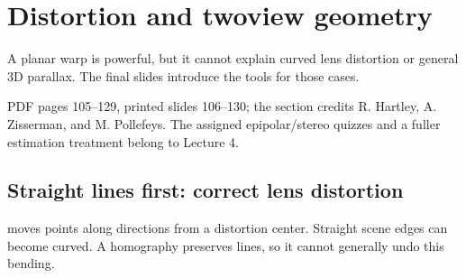 \documentclass[letterpaper,11pt,english,openany,oneside]{jupyterBook}
\begin{document}
\section{Distortion and two\sphinxhyphen{}view geometry}
\label{\detokenize{lectures/lecture02/two-view:distortion-and-two-view-geometry}}\label{\detokenize{lectures/lecture02/two-view:lec02-two-view}}\label{\detokenize{lectures/lecture02/two-view::doc}}
\sphinxAtStartPar
A planar warp is powerful, but it cannot explain curved lens distortion or general 3D parallax. The final slides introduce the tools for those cases.

\sphinxAtStartPar
{} PDF pages 105–129, printed slides 106–130; the section credits R. Hartley, A. Zisserman, and M. Pollefeys. The assigned epipolar/stereo quizzes and a fuller estimation treatment belong to Lecture 4.


\subsection{Straight lines first: correct lens distortion}
\label{\detokenize{lectures/lecture02/two-view:straight-lines-first-correct-lens-distortion}}
\sphinxAtStartPar
{} moves points along directions from a distortion center. Straight scene edges can become curved. A homography preserves lines, so it cannot generally undo this bending.
\end{document}
